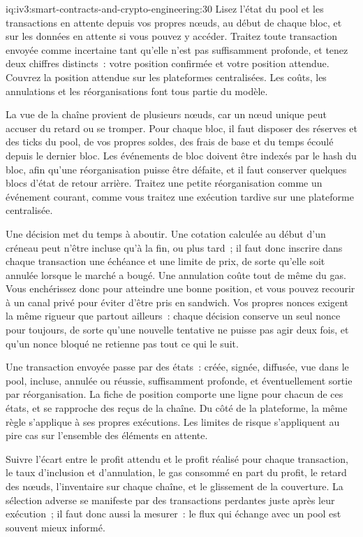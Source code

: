 \begin{solution}{iq:iv3:smart-contracts-and-crypto-engineering:30}
Lisez l'état du pool et les transactions en attente depuis vos propres nœuds, au début de chaque bloc, et sur les données en attente si vous pouvez y accéder. Traitez toute transaction envoyée comme incertaine tant qu'elle n'est pas suffisamment profonde, et tenez deux chiffres distincts~: votre position confirmée et votre position attendue. Couvrez la position attendue sur les plateformes centralisées. Les coûts, les annulations et les réorganisations font tous partie du modèle.

La vue de la chaîne provient de plusieurs nœuds, car un nœud unique peut accuser du retard ou se tromper. Pour chaque bloc, il faut disposer des réserves et des ticks du pool, de vos propres soldes, des frais de base et du temps écoulé depuis le dernier bloc. Les événements de bloc doivent être indexés par le hash du bloc, afin qu'une réorganisation puisse être défaite, et il faut conserver quelques blocs d'état de retour arrière. Traitez une petite réorganisation comme un événement courant, comme vous traitez une exécution tardive sur une plateforme centralisée.

Une décision met du temps à aboutir. Une cotation calculée au début d'un créneau peut n'être incluse qu'à la fin, ou plus tard~; il faut donc inscrire dans chaque transaction une échéance et une limite de prix, de sorte qu'elle soit annulée lorsque le marché a bougé. Une annulation coûte tout de même du gas. Vous enchérissez donc pour atteindre une bonne position, et vous pouvez recourir à un canal privé pour éviter d'être pris en sandwich. Vos propres nonces exigent la même rigueur que partout ailleurs~: chaque décision conserve un seul nonce pour toujours, de sorte qu'une nouvelle tentative ne puisse pas agir deux fois, et qu'un nonce bloqué ne retienne pas tout ce qui le suit.

Une transaction envoyée passe par des états~: créée, signée, diffusée, vue dans le pool, incluse, annulée ou réussie, suffisamment profonde, et éventuellement sortie par réorganisation. La fiche de position comporte une ligne pour chacun de ces états, et se rapproche des reçus de la chaîne. Du côté de la plateforme, la même règle s'applique à ses propres exécutions. Les limites de risque s'appliquent au pire cas sur l'ensemble des éléments en attente.

Suivre l'écart entre le profit attendu et le profit réalisé pour chaque transaction, le taux d'inclusion et d'annulation, le gas consommé en part du profit, le retard des nœuds, l'inventaire sur chaque chaîne, et le glissement de la couverture. La sélection adverse se manifeste par des transactions perdantes juste après leur exécution~; il faut donc aussi la mesurer~: le flux qui échange avec un pool est souvent mieux informé.


\end{solution}
